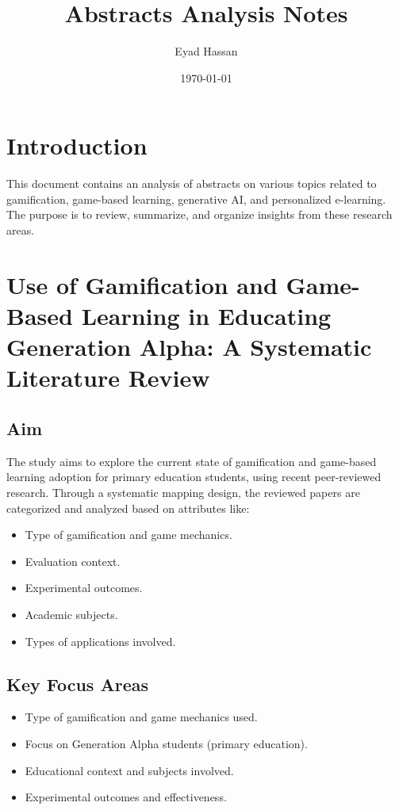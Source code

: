 \documentclass{article}
\title{Abstracts Analysis Notes}
\author{Eyad Hassan}
\date{\today}
\begin{document}
\maketitle

\section{Introduction}
This document contains an analysis of abstracts on various topics related to gamification, game-based learning, generative AI, and personalized e-learning. The purpose is to review, summarize, and organize insights from these research areas.

\newpage
\section{Use of Gamification and Game-Based Learning in Educating Generation Alpha: A Systematic Literature Review}

\subsection{Aim}
The study aims to explore the current state of gamification and game-based learning adoption for primary education students, using recent peer-reviewed research. Through a systematic mapping design, the reviewed papers are categorized and analyzed based on attributes like:
\begin{itemize}
    \item Type of gamification and game mechanics.
    \item Evaluation context.
    \item Experimental outcomes.
    \item Academic subjects.
    \item Types of applications involved.
\end{itemize}

\subsection{Key Focus Areas}
\begin{itemize}
    \item Type of gamification and game mechanics used.
    \item Focus on Generation Alpha students (primary education).
    \item Educational context and subjects involved.
    \item Experimental outcomes and effectiveness.
\end{itemize}
\end{document}
